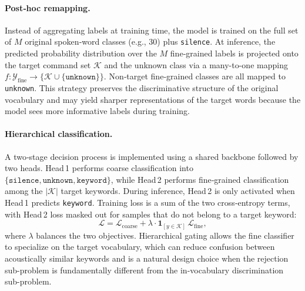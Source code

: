 \documentclass[11pt]{article}
\begin{document}
\paragraph{Post‑hoc remapping.}
Instead of aggregating labels at training time, the model is trained on the full set of $M$ original spoken‑word classes (e.g., 30) plus \texttt{silence}. 
At inference, the predicted probability distribution over the $M$ fine‑grained labels is projected onto the target command set $\mathcal{K}$ and the unknown class via a many-to-one mapping $f: \mathcal{Y}_{\text{fine}} \rightarrow \{\mathcal{K} \cup \{\texttt{unknown}\}\}$. 
Non‑target fine‑grained classes are all mapped to \texttt{unknown}. 
This strategy preserves the discriminative structure of the original vocabulary and may yield sharper representations of the target words because the model sees more informative labels during training.

\paragraph{Hierarchical classification.}
A two‑stage decision process is implemented using a shared backbone followed by two heads. 
Head 1 performs coarse classification into $\{\texttt{silence}, \texttt{unknown}, \texttt{keyword}\}$, while Head 2 performs fine‑grained classification among the $|\mathcal{K}|$ target keywords. 
During inference, Head 2 is only activated when Head 1 predicts \texttt{keyword}. 
Training loss is a sum of the two cross‑entropy terms, with Head 2 loss masked out for samples that do not belong to a target keyword:
\begin{equation}
    \mathcal{L} = \mathcal{L}_{\text{coarse}} + \lambda \cdot \mathbf{1}_{[y \in \mathcal{K}]}\, \mathcal{L}_{\text{fine}},
\end{equation}
where $\lambda$ balances the two objectives. 
Hierarchical gating allows the fine classifier to specialize on the target vocabulary, which can reduce confusion between acoustically similar keywords and is a natural design choice when the rejection sub-problem is fundamentally different from the in-vocabulary discrimination sub-problem.
\end{document}
